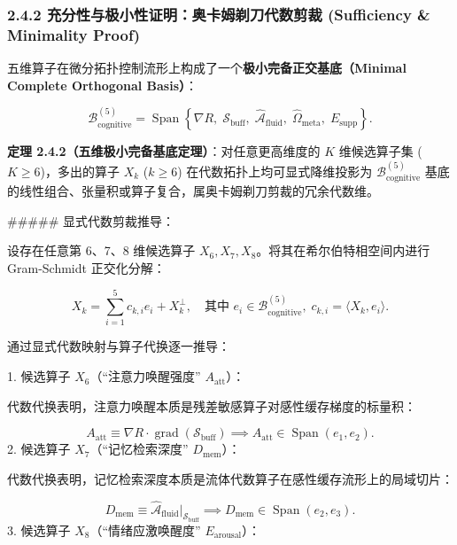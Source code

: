 \documentclass[11pt,a4paper,oneside]{ctexart}
\begin{document}
\subsubsection{2.4.2 充分性与极小性证明：奥卡姆剃刀代数剪裁 (Sufficiency \& Minimality Proof)}

五维算子在微分拓扑控制流形上构成了一个\textbf{极小完备正交基底（Minimal Complete Orthogonal Basis）}：

\begin{equation}
\mathcal{B}_{\text{cognitive}}^{(5)} = \operatorname{Span}\left\{ \nabla R, \; \mathcal{S}_{\text{buff}}, \; \hat{\mathcal{A}}_{\text{fluid}}, \; \hat{\Omega}_{\text{meta}}, \; E_{\text{supp}} \right\}.
\end{equation}

\textbf{定理 2.4.2（五维极小完备基底定理）}：对任意更高维度的 $K$ 维候选算子集 ($K \ge 6$)，多出的算子 $X_k$ ($k \ge 6$) 在代数拓扑上均可显式降维投影为 $\mathcal{B}_{\text{cognitive}}^{(5)}$ 基底的线性组合、张量积或算子复合，属奥卡姆剃刀剪裁的冗余代数维。


\#\#\#\#\# 显式代数剪裁推导：

设存在任意第 6、7、8 维候选算子 $X_6, X_7, X_8$。将其在希尔伯特相空间内进行 Gram-Schmidt 正交化分解：

\begin{equation}
X_k = \sum_{i=1}^5 c_{k,i} e_i + X_k^\perp, \quad \text{其中 } e_i \in \mathcal{B}_{\text{cognitive}}^{(5)}, \; c_{k,i} = \langle X_k, e_i \rangle.
\end{equation}

通过显式代数映射与算子代换逐一推导：

1. \textit{}候选算子 $X_6$（“注意力唤醒强度” $A_{\text{att}}$）\textit{}：

代数代换表明，注意力唤醒本质是残差敏感算子对感性缓存梯度的标量积：

\begin{equation}
A_{\text{att}} \equiv \nabla R \cdot \operatorname{grad}(\mathcal{S}_{\text{buff}}) \implies A_{\text{att}} \in \operatorname{Span}(e_1, e_2).
\end{equation}
2. \textit{}候选算子 $X_7$（“记忆检索深度” $D_{\text{mem}}$）\textit{}：

代数代换表明，记忆检索深度本质是流体代数算子在感性缓存流形上的局域切片：

\begin{equation}
D_{\text{mem}} \equiv \hat{\mathcal{A}}_{\text{fluid}} \Big|_{\mathcal{S}_{\text{buff}}} \implies D_{\text{mem}} \in \operatorname{Span}(e_2, e_3).
\end{equation}
3. \textit{}候选算子 $X_8$（“情绪应激唤醒度” $E_{\text{arousal}}$）\textit{}：
\end{document}
